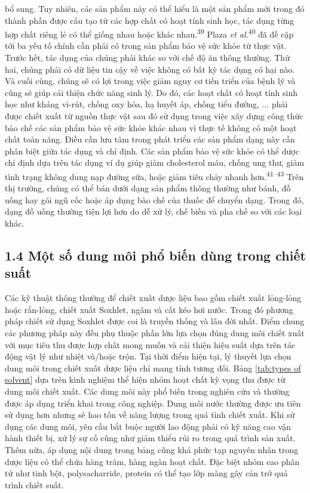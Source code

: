 \documentclass[
  letterpaper,
  DIV=11,
  numbers=noendperiod]{scrartcl}
\begin{document}
bổ sung. Tuy nhiên, các sản phẩm này có thể hiểu là một sản phẩm mới
trong đó thành phần được cấu tạo từ các hợp chất có hoạt tính sinh học,
tác dụng từng hợp chất riêng lẻ có thể giống nhau hoặc khác
nhau.\textsuperscript{39} Plaza \emph{et al.}\textsuperscript{40} đã đề
cập tới ba yếu tố chính cần phải có trong sản phẩm bảo vệ sức khỏe từ
thực vật. Trước hết, tác dụng của chúng phải khác so với chế độ ăn thông
thường. Thứ hai, chúng phải có dữ liệu tin cậy về việc không có bất kỳ
tác dụng có hại nào. Và cuối cùng, chúng sẽ có lợi trong việc giảm nguy
cơ tiến triển của bệnh lý và cũng sẽ giúp cải thiện chức năng sinh lý.
Do đó, các hoạt chất có hoạt tính sinh học như kháng vi-rút, chống oxy
hóa, hạ huyết áp, chống tiểu đường, \(\ldots\) phải được chiết xuất từ
nguồn thực vật sau đó sử dụng trong việc xây dựng công thức bào chế các
sản phẩm bảo vệ sức khỏe khác nhau vì thực tế không có một hoạt chất
toàn năng. Điều cần lưu tâm trong phát triển các sản phẩm dạng này cần
phân biệt giữa tác dụng và chỉ định. Các sản phẩm bảo vệ sức khỏe có thể
dược chỉ định dựa trên tác dụng ví dụ giúp giảm cholesterol máu, chống
ung thư, giảm tình trạng không dung nạp đường sữa, hoặc giảm tiêu chảy
nhanh hơn.\textsuperscript{41--43} Trên thị trường, chúng có thể bán
dưới dạng sản phẩm thông thường như bánh, đồ uống hay gói ngũ cốc hoặc
áp dụng bào chế của thuốc để chuyển dạng. Trong đó, dạng đồ uống thường
tiện lợi hơn do dễ xử lý, chế biến và pha chế so với các loại khác.

\subsection{1.4 Một số dung môi phổ biến dùng trong chiết
suất}\label{mux1ed9t-sux1ed1-dung-muxf4i-phux1ed5-biux1ebfn-duxf9ng-trong-chiux1ebft-suux1ea5t}

Các kỹ thuật thông thường để chiết xuất dược liệu bao gồm chiết xuất
lỏng-lỏng hoặc rắn-lỏng, chiết xuất Soxhlet, ngâm và cất kéo hơi nước.
Trong đó phương pháp chiết sử dụng Soxhlet được coi là truyền thống và
lâu đời nhất. Điểm chung các phương pháp này đều phụ thuộc phần lớn lựa
chọn đúng dung môi chiết xuất với mục tiêu thu được hợp chất mong muốn
và cải thiện hiệu suất dựa trên tác động vật lý như nhiệt và/hoặc trộn.
Tại thời điểm hiện tại, lý thuyết lựa chọn dung môi trong chiết xuất
dược liệu chỉ mang tính tương đối. Bảng
\hyperref[tab:typesux5cux2520ofux5cux2520solvent]{{[}tab:types of
solvent{]}} dựa trên kinh nghiệm thể hiện nhóm hoạt chất kỳ vọng thu
được từ dung môi chiết xuất. Các dung môi này phổ biến trong nghiên cứu
và thường được áp dụng triển khai trong công nghiệp. Dung môi nước
thường được ưu tiên sử dụng hơn nhưng sẽ hao tốn về năng lượng trong quá
tình chiết xuất. Khi sử dụng các dung môi, yêu cầu bắt buộc người lao
động phải có kỹ năng cao vận hành thiết bị, xử lý sự cố cũng như giảm
thiểu rủi ro trong quá trình sản xuất. Thêm nữa, áp dụng nội dung trong
bảng cũng khá phức tạp nguyên nhân trong dược liệu có thể chứa hàng
trăm, hàng ngàn hoạt chất. Đặc biệt nhóm cao phân tử như tinh bột,
polysacharride, protein có thể tạo lớp màng gây cản trở quá trình chiết
suất.
\end{document}
